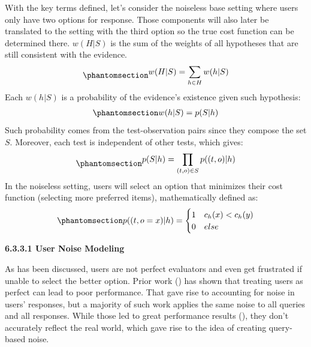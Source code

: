\documentclass[
  letterpaper,
  numbers=noenddot,
  DIV=11]{scrreprt}
\theoremstyle{definition}
\theoremstyle{plain}
\theoremstyle{plain}
\theoremstyle{remark}
\begin{document}
With the key terms defined, let's consider the noiseless base setting
where users only have two options for response. Those components will
also later be translated to the setting with the third option so the
true cost function can be determined there. \(w(H|S)\) is the sum of the
weights of all hypotheses that are still consistent with the evidence.
\begin{equation}\phantomsection\label{eq-eq3.25}{\begin{aligned}
    w(H|S) = \sum_{h \in H} w(h | S)\\
\end{aligned}}\end{equation} Each \(w(h|S)\) is a probability of the
evidence's existence given such hypothesis:
\begin{equation}\phantomsection\label{eq-eq3.26}{\begin{aligned}
    w(h|S) = p(S|h)
\end{aligned}}\end{equation} Such probability comes from the
test-observation pairs since they compose the set \(S\). Moreover, each
test is independent of other tests, which gives:
\begin{equation}\phantomsection\label{eq-eq3.27}{\begin{aligned}
    p(S|h) = \prod_{(t,o) \in S} p((t,o) | h)
\end{aligned}}\end{equation} In the noiseless setting, users will select
an option that minimizes their cost function (selecting more preferred
items), mathematically defined as:
\begin{equation}\phantomsection\label{eq-prob_base}{\begin{aligned}
    p((t, o = x) | h) = 
    \begin{cases}
        1 & c_h(x) < c_h(y)\\
        0 & else
    \end{cases}
\end{aligned}}\end{equation}

\textbf{6.3.3.1 User Noise Modeling}

As has been discussed, users are not perfect evaluators and even get
frustrated if unable to select the better option. Prior work
() has shown that
treating users as perfect can lead to poor performance. That gave rise
to accounting for noise in users' responses, but a majority of such work
applies the same noise to all queries and all responses. While those led
to great performance results (), they don't accurately reflect the real world, which gave
rise to the idea of creating query-based noise.
\end{document}
